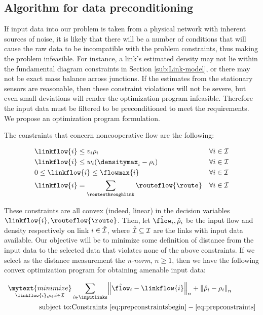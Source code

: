 \subsection{Algorithm for data preconditioning\label{sub:Preparing-Input-Data}}

If input data into our problem is taken from a physical network with
inherent sources of noise, it is likely that there will be a number
of conditions that will cause the raw data to be incompatible with
the problem constraints, thus making the problem infeasible. For instance,
a link's estimated density may not lie within the fundamental diagram
constraints in Section \ref{sub:Link-model}, or there may not be
exact mass balance across junctions. If the estimates from the stationary
sensors are reasonable, then these constraint violations will not
be severe, but even small deviations will render the optimization
program infeasible. Therefore the input data must be filtered to be
preconditioned to meet the requirements. We propose an optimization
program formulation.

The constraints that concern noncooperative flow are the following:

\begin{eqnarray}
 & \linkflow{\link}\le\ffspeed_{\link}\density_{\link} & \forall\link\in\links\label{eq:prepconstraintsbegin}\\
 & \linkflow{\link}\le\congspeed_{\link}\left(\densitymax_{\link}-\density_{\link}\right) & \forall\link\in\links\\
 & 0\le\linkflow{\link}\le\flowmax{\link} & \forall\link\in\links\\
 & \linkflow{\link}=\sum_{\routesthroughlink}\routeflow{\route} & \forall\link\in\links\label{eq:prepconstraints}
\end{eqnarray}


These constraints are all convex (indeed, linear) in the decision
variables $\linkflow{\link},\routeflow{\route}$. Then, let $\hat{\flow}_{\link},\hat{\density}_{\link}$
be the input flow and density respectively on link $i\in\hat{\mathcal{I}}$,
where $\hat{\mathcal{I}}\subseteq\mathcal{I}$ are the links with input data
available. Our objective will be to minimize some definition of distance
from the input data to the selected data that violates none of the
above constraints. If we select as the distance measurement the \emph{n-norm},
$n\ge1$, then we have the following convex optimization program for
obtaining amenable input data:

\begin{eqnarray*}
\underset{\linkflow{\link},\density_{\link}:\link\in\links}{\mytext{minimize}} & \sum_{\link\in\inputlinks}\left\Vert \hat{\flow}_{\link}-\linkflow{\link}\right\Vert _{n}+\left\Vert \hat{\density}_{\link}-\density_{\link}\right\Vert _{n}\\
\text{subject to:} & \text{Constraints }\eqref{eq:prepconstraintsbegin}-\eqref{eq:prepconstraints}
\end{eqnarray*}


